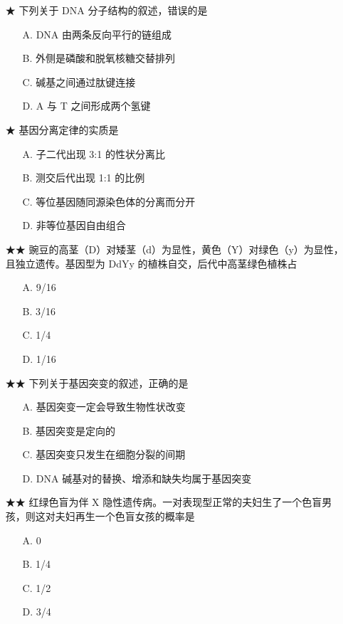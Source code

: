 \begin{enumerate}
  \item[★] 下列关于 DNA 分子结构的叙述，错误的是
  \begin{enumerate}
    \item[A.] DNA 由两条反向平行的链组成
    \item[B.] 外侧是磷酸和脱氧核糖交替排列
    \item[C.] 碱基之间通过肽键连接
    \item[D.] A 与 T 之间形成两个氢键
  \end{enumerate}
  \vspace{0.8cm}

  \item[★] 基因分离定律的实质是
  \begin{enumerate}
    \item[A.] 子二代出现 3:1 的性状分离比
    \item[B.] 测交后代出现 1:1 的比例
    \item[C.] 等位基因随同源染色体的分离而分开
    \item[D.] 非等位基因自由组合
  \end{enumerate}
  \vspace{0.8cm}

  \item[★★] 豌豆的高茎（D）对矮茎（d）为显性，黄色（Y）对绿色（y）为显性，且独立遗传。基因型为 DdYy 的植株自交，后代中高茎绿色植株占
  \begin{enumerate}
    \item[A.] 9/16
    \item[B.] 3/16
    \item[C.] 1/4
    \item[D.] 1/16
  \end{enumerate}
  \vspace{0.8cm}

  \item[★★] 下列关于基因突变的叙述，正确的是
  \begin{enumerate}
    \item[A.] 基因突变一定会导致生物性状改变
    \item[B.] 基因突变是定向的
    \item[C.] 基因突变只发生在细胞分裂的间期
    \item[D.] DNA 碱基对的替换、增添和缺失均属于基因突变
  \end{enumerate}
  \vspace{0.8cm}

  \item[★★] 红绿色盲为伴 X 隐性遗传病。一对表现型正常的夫妇生了一个色盲男孩，则这对夫妇再生一个色盲女孩的概率是
  \begin{enumerate}
    \item[A.] 0
    \item[B.] 1/4
    \item[C.] 1/2
    \item[D.] 3/4
  \end{enumerate}
  \vspace{0.8cm}


\end{enumerate}
